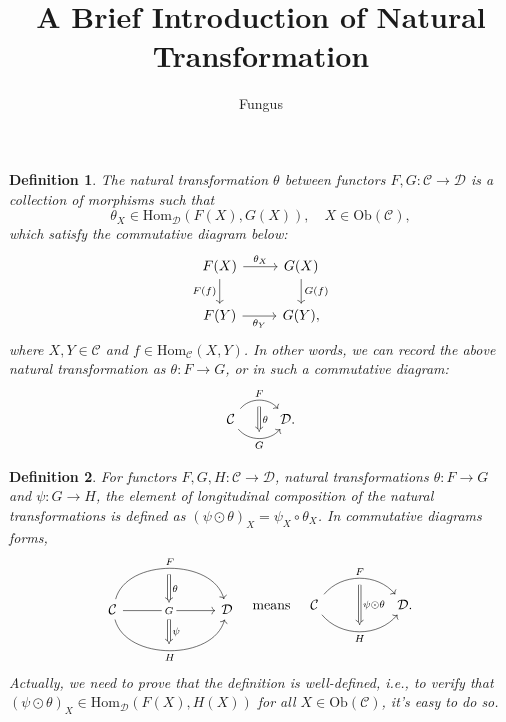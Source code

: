\documentclass{article}
\title{A Brief Introduction of Natural Transformation}
\author{Fungus}
\begin{document}
\maketitle
\newtheorem{defi}{Definition}	\newtheorem{thm}{Theorem}

\begin{defi}\label{natural transformation}
	The {\rm natural transformation} $\theta$ between functors $F,G:\mathcal{C}\to\mathcal{D}$ is a collection of morphisms such that
	\[\theta_X\in\mathrm{Hom}_\mathcal{D}(F(X),G(X)),\quad X\in\mathrm{Ob}(\mathcal{C}),\]
	which satisfy the commutative diagram below:
	\begin{equation}\begin{tikzcd}
		F(X) \arrow[r,"\theta_X"] \arrow[d,"F(f)"'] & G(X) \arrow[d,"G(f)"] \\
		F(Y) \arrow[r,"\theta_Y"'] & G(Y),
	\end{tikzcd}\end{equation}
	where $X,Y\in\mathcal{C}$ and $f\in\mathrm{Hom}_\mathcal{C}(X,Y)$. In other words, we can record the above natural transformation as $\theta:F\to G$, or in such a commutative diagram:
	\[\begin{tikzcd}
		\mathcal{C} \arrow[r, "F", bend left=50, ""' name=F] \arrow[r, "G"', bend right=50, "" name=G] & \arrow[Rightarrow, to path=(F)--(G)\tikztonodes, "\theta"] \mathcal{D}.
	\end{tikzcd}\]
\end{defi}


\begin{defi}\label{longitudinal composition}
	For functors $F,G,H:\mathcal{C}\to\mathcal{D}$, natural transformations $\theta:F\to G$ and $\psi:G\to H$, the element of {\rm longitudinal composition} of the natural transformations is defined as $(\psi\odot\theta)_X=\psi_X\circ\theta_X$. In commutative diagrams forms,
	\[\begin{tikzcd}
			& \arrow[d,Rightarrow,"\theta"]& \\
			\mathcal{C} \arrow[rr, "F", bend left=75] \arrow[rr, "H"', bend right=75] \arrow[rr, "G" description] &
			\textcolor{white}{s} \arrow[d,Rightarrow,"\psi"] &
			\mathcal{D}\\ & \quad &
		\end{tikzcd}\quad\text{means}\quad\begin{tikzcd}
			\mathcal{C}
			\arrow[bend left=50, rr, "F", ""' name=F]
			\arrow[bend right=50, rr, "H"', "" name=H] & & 
			\arrow[Rightarrow, from=F, to=H, "\psi\odot\theta"] \mathcal{D}.
	\end{tikzcd}\]
	Actually, we need to prove that the definition is well-defined, i.e., to verify that $(\psi\odot\theta)_X\in\mathrm{Hom}_\mathcal{D}(F(X),H(X))$ for all $X\in\mathrm{Ob}(\mathcal{C})$, it's easy to do so.
\end{defi}
\end{document}
